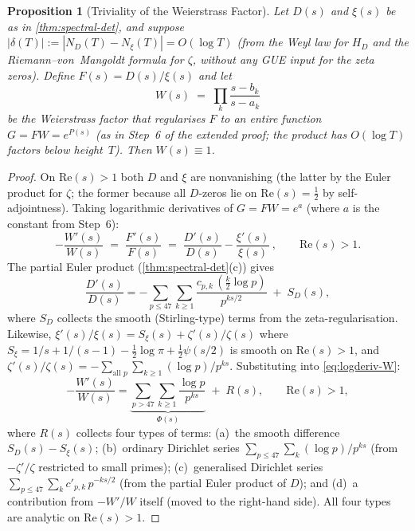 \documentclass[11pt,a4paper]{article}
\theoremstyle{plain}
\newtheorem{proposition}[theorem]{Proposition}
\theoremstyle{remark}
\begin{document}
\begin{proposition}[Triviality of the Weierstrass Factor]
\label{prop:W-trivial}
Let $D(s)$ and $\xi(s)$ be as in \cref{thm:spectral-det}, and suppose
$|\delta(T)|:=|N_D(T)-N_\xi(T)| = O(\log T)$
\textup{(}from the Weyl law for $H_D$ and the Riemann--von~Mangoldt
formula for $\zeta$, without any GUE input for the zeta zeros\textup{)}.
Define $F(s)=D(s)/\xi(s)$ and let
\[
  W(s) \;=\; \prod_{k} \frac{s-b_k}{s-a_k}
\]
be the Weierstrass factor that regularises $F$ to an entire function
$G=FW=e^{P(s)}$ \textup{(}as in Step~6 of the extended proof; the
product has $O(\log T)$ factors below height~$T$\textup{)}.
Then $W(s)\equiv 1$.
\end{proposition}

\begin{proof}
On $\mathrm{Re}(s)>1$ both $D$ and $\xi$ are nonvanishing (the latter
by the Euler product for $\zeta$; the former because all $D$-zeros lie
on $\mathrm{Re}(s)=\frac{1}{2}$ by self-adjointness).
Taking logarithmic derivatives of $G=FW=e^a$ (where $a$ is the
constant from Step~6):
\begin{equation}\label{eq:logderiv-W}
  -\frac{W'(s)}{W(s)}
  \;=\; \frac{F'(s)}{F(s)}
  \;=\; \frac{D'(s)}{D(s)} - \frac{\xi'(s)}{\xi(s)}\,,
  \qquad \mathrm{Re}(s)>1.
\end{equation}
The partial Euler product (\cref{thm:spectral-det}(c)) gives
\[
  \frac{D'(s)}{D(s)}
  = -\sum_{p\leq 47}\sum_{k\geq 1}
    \frac{c_{p,k}\,(\tfrac{k}{2}\log p)}{p^{ks/2}}
  \;+\; S_D(s),
\]
where $S_D$ collects the smooth (Stirling-type) terms from the
zeta-regularisation.  Likewise,
$\xi'(s)/\xi(s) = S_\xi(s) + \zeta'(s)/\zeta(s)$ where
$S_\xi = 1/s + 1/(s{-}1) - \tfrac{1}{2}\log\pi + \tfrac{1}{2}\psi(s/2)$
is smooth on $\mathrm{Re}(s)>1$, and
$\zeta'(s)/\zeta(s) = -\sum_{\text{all }p}\sum_{k\geq 1}
(\log p)/p^{ks}$.
Substituting into \cref{eq:logderiv-W}:
\begin{equation}\label{eq:W-dirichlet}
  -\frac{W'(s)}{W(s)}
  = \underbrace{\sum_{p>47}\sum_{k\geq 1}
    \frac{\log p}{p^{ks}}}_{\displaystyle\Phi(s)}
  \;+\; R(s),
  \qquad \mathrm{Re}(s)>1,
\end{equation}
where $R(s)$ collects four types of terms: (a)~the smooth difference
$S_D(s)-S_\xi(s)$; (b)~ordinary Dirichlet series
$\sum_{p\leq 47}\sum_k (\log p)/p^{ks}$ (from $-\zeta'/\zeta$
restricted to small primes); (c)~generalised Dirichlet series
$\sum_{p\leq 47}\sum_k c'_{p,k}\,p^{-ks/2}$ (from the partial Euler
product of $D$); and (d)~a contribution from $-W'/W$ itself (moved to the right-hand side).  All four types are analytic on $\mathrm{Re}(s)>1$.


\end{proof}
\end{document}
